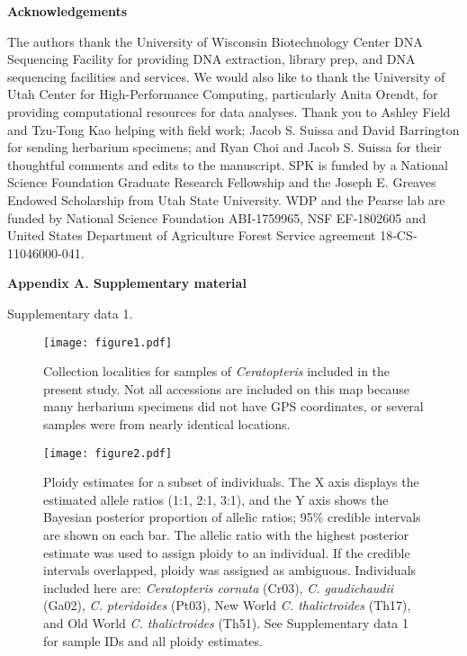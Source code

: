 \documentclass[12pt]{article}
\begin{document}
\begin{flushleft}
\vspace{1cm}

{\large\textbf{Acknowledgements}}

The authors thank the University of Wisconsin Biotechnology Center DNA Sequencing Facility for providing DNA extraction, library prep, and DNA sequencing facilities and services. We would also like to thank the University of Utah Center for High-Performance Computing, particularly Anita Orendt, for providing computational resources for data analyses. Thank you to Ashley Field and Tzu-Tong Kao helping with field work; Jacob S. Suissa and David Barrington for sending herbarium specimens; and Ryan Choi and Jacob S. Suissa for their thoughtful comments and edits to the manuscript. SPK is funded by a National Science Foundation Graduate Research Fellowship and the Joseph E. Greaves Endowed Scholarship from Utah State University. WDP and the Pearse lab are funded by National Science Foundation ABI‐1759965, NSF EF‐1802605 and United States Department of Agriculture Forest Service agreement 18‐CS‐11046000‐041.

\vspace{1cm}

{\large\textbf{Appendix A. Supplementary material}}

Supplementary data 1.

\end{flushleft}
\vspace{30cm}

\begin{figure}[H]
\centering
\texttt{[image: figure1.pdf]}
\caption{Collection localities for samples of \textit{Ceratopteris} included in the present study. Not all accessions are included on this map because many herbarium specimens did not have GPS coordinates, or several samples were from nearly identical locations.}
\label{map}
\end{figure}

\begin{figure}[H]
\centering
\texttt{[image: figure2.pdf]}
\caption{Ploidy estimates for a subset of individuals. The X axis displays the estimated allele ratios (1:1, 2:1, 3:1), and the Y axis shows the Bayesian posterior proportion of allelic ratios; 95\% credible intervals are shown on each bar. The allelic ratio with the highest posterior estimate was used to assign ploidy to an individual. If the credible intervals overlapped, ploidy was assigned as ambiguous. Individuals included here are: \textit{Ceratopteris cornuta} (Cr03), \textit{C. gaudichaudii} (Ga02), \textit{C. pteridoides} (Pt03), New World \textit{C. thalictroides} (Th17), and Old World \textit{C. thalictroides} (Th51). See Supplementary data 1 for sample IDs and all ploidy estimates.}
\label{g2p}
\end{figure}
\end{document}

